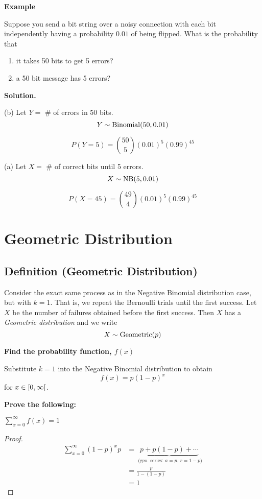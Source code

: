\textbf{Example}

Suppose you send a bit string over a noisy connection with
each bit independently having a probability $ 0.01 $ of being
flipped. What is the probability that
\begin{enumerate}[label=(\alph*)]
    \item it takes 50 bits to get 5 errors?
    \item a 50 bit message has 5 errors?
\end{enumerate}

\textbf{Solution.}

(b) Let $ Y= $ \# of errors in 50 bits.
\[ Y\sim\operatorname{Binomial}(50,0.01) \]

\[ P(Y=5)=\binom{50}{5}(0.01)^5(0.99)^{45} \]

(a) Let $ X= $ \# of correct bits until 5 errors.
\[ X\sim\operatorname{NB}(5,0.01) \]

\[ P(X=45)=\binom{49}{4}(0.01)^5(0.99)^{45} \]

\section{Geometric Distribution}

\begin{defbox}
    \subsection{Definition (Geometric Distribution)}
    Consider the exact same process as in the Negative Binomial distribution
    case, but with $ k=1 $. That is, we repeat the Bernoulli trials until
    the first success. Let $ X $ be the number of failures obtained before
    the first success. Then $ X $ has a \emph{Geometric distribution}
    and we write
    \[ X \sim \operatorname{Geometric}(p) \]
\end{defbox}

\textbf{Find the probability function, $ f(x)$}

Substitute $ k=1 $ into the Negative Binomial distribution to obtain
\[ f(x)=p(1-p)^x \]
for $ x\in\rinterval{0}{\infty} $.

\textbf{Prove the following:}

$ \sum\limits_{x=0}^{\infty} f(x) = 1$

\begin{proof}
    \begin{align*}
        \sum\limits_{x=0}^{\infty} (1-p)^x p
         & =\underbrace{p+p(1-p)+\cdots}_
        \text{ (geo.\ series: $a=p$, $r=1-p$)} \\
         & =\frac{p}{1-(1-p)}                  \\
         & =1
    \end{align*}
\end{proof}

